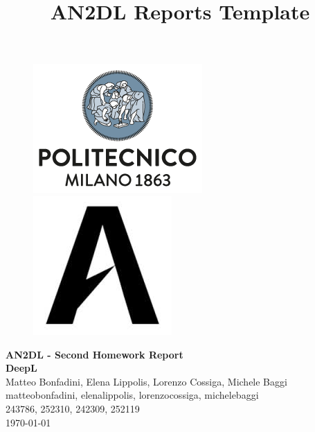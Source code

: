 \documentclass[11pt]{article}
\title{AN2DL Reports Template}
\begin{document}
    
    \begin{figure}[H]
        \raggedright
        \includegraphics[scale=0.4]{figures/polimi.png} \hfill \includegraphics[scale=0.3]{figures/airlab.jpeg}
    \end{figure}
    
    \vspace{5mm}
    
    \begin{center}
        {\Large \textbf{AN2DL - Second Homework Report}}\\
        \vspace{2mm}
        {\Large \textbf{DeepL}}\\
        \vspace{2mm}
        {\large Matteo Bonfadini,}
        {\large Elena Lippolis,}
        {\large Lorenzo Cossiga,}
        {\large Michele Baggi}\\
        \vspace{2mm}
        {matteobonfadini,}
        {elenalippolis,}
        {lorenzocossiga,}
        {michelebaggi}\\
        \vspace{2mm}
        {243786,}
        {252310,}
        {242309,}
        {252119}\\
        \vspace{5mm}
        \today
    \end{center}    
    \vspace{5mm}
\end{document}
